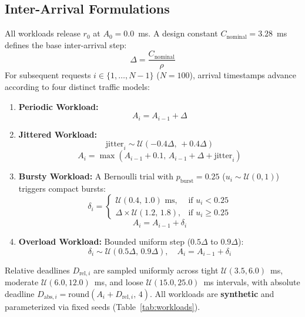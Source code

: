 \documentclass[conference]{IEEEtran}
\begin{document}
\subsection{Inter-Arrival Formulations}
All workloads release $r_0$ at $A_0 = 0.0$~ms. A design constant $C_{\text{nominal}} = 3.28$~ms defines the base inter-arrival step:
\begin{equation}
\Delta = \frac{C_{\text{nominal}}}{\rho}
\end{equation}
For subsequent requests $i \in \{1, \dots, N-1\}$ ($N=100$), arrival timestamps advance according to four distinct traffic models:
\begin{enumerate}
    \item \textbf{Periodic Workload:}
    \begin{equation}
    A_i = A_{i-1} + \Delta
    \end{equation}
    \item \textbf{Jittered Workload:}
    \begin{equation}
    \text{jitter}_i \sim \mathcal{U}(-0.4\Delta, \, +0.4\Delta)
    \end{equation}
    \begin{equation}
    A_i = \max(A_{i-1} + 0.1, \, A_{i-1} + \Delta + \text{jitter}_i)
    \end{equation}
    \item \textbf{Bursty Workload:} A Bernoulli trial with $p_{\text{burst}} = 0.25$ ($u_i \sim \mathcal{U}(0, 1)$) triggers compact bursts:
    \begin{equation}
    \delta_i = \begin{cases}
    \mathcal{U}(0.4, \, 1.0)\text{ ms}, & \text{if } u_i < 0.25 \\
    \Delta \times \mathcal{U}(1.2, \, 1.8), & \text{if } u_i \ge 0.25
    \end{cases}
    \end{equation}
    \begin{equation}
    A_i = A_{i-1} + \delta_i
    \end{equation}
    \item \textbf{Overload Workload:} Bounded uniform step ($0.5\Delta$ to $0.9\Delta$):
    \begin{equation}
    \delta_i \sim \mathcal{U}(0.5\Delta, \, 0.9\Delta), \quad A_i = A_{i-1} + \delta_i
    \end{equation}
\end{enumerate}
Relative deadlines $D_{\text{rel}, i}$ are sampled uniformly across tight $\mathcal{U}(3.5, 6.0)$~ms, moderate $\mathcal{U}(6.0, 12.0)$~ms, and loose $\mathcal{U}(15.0, 25.0)$~ms intervals, with absolute deadline $D_{\text{abs}, i} = \text{round}(A_i + D_{\text{rel}, i}, \, 4)$. All workloads are \textbf{synthetic} and parameterized via fixed seeds (Table~\ref{tab:workloads}).
\end{document}
